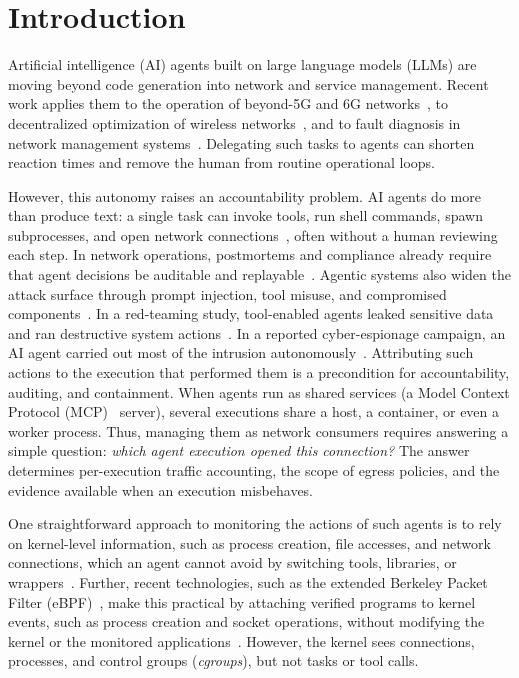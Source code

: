 \section{Introduction}

Artificial intelligence (AI) agents built on large language models (LLMs) are moving beyond code generation into network and service management. Recent work applies them to the operation of beyond-5G and 6G networks~\cite{corici2025agents,xiao2025agentic}, to decentralized optimization of wireless networks~\cite{lee2025decentralized}, and to fault diagnosis in network management systems~\cite{chen2025assistant}. Delegating such tasks to agents can shorten reaction times and remove the human from routine operational loops.

However, this autonomy raises an accountability problem. AI agents do more than produce text: a single task can invoke tools, run shell commands, spawn subprocesses, and open network connections~\cite{yao2023react}, often without a human reviewing each step. In network operations, postmortems and compliance already require that agent decisions be auditable and replayable~\cite{martinezpaez2026vetra}. Agentic systems also widen the attack surface through prompt injection, tool misuse, and compromised components~\cite{chhabra2026agentic,ma2026openclaw}. In a red-teaming study, tool-enabled agents leaked sensitive data and ran destructive system actions~\cite{shapira2026chaos}. In a reported cyber-espionage campaign, an AI agent carried out most of the intrusion autonomously~\cite{anthropic2025espionage,dawson2026agentic}. Attributing such actions to the execution that performed them is a precondition for accountability, auditing, and containment. When agents run as shared services (\eg a Model Context Protocol (MCP)~\cite{mcp2025spec} server), several executions share a host, a container, or even a worker process. Thus, managing them as network consumers requires answering a simple question: \emph{which agent execution opened this connection?} The answer determines per-execution traffic accounting, the scope of egress policies, and the evidence available when an execution misbehaves.

One straightforward approach to monitoring the actions of such agents is to rely on kernel-level information, such as process creation, file accesses, and network connections, which an agent cannot avoid by switching tools, libraries, or wrappers~\cite{tetragon}. Further, recent technologies, such as the extended Berkeley Packet Filter (eBPF)~\cite{ebpf}, make this practical by attaching verified programs to kernel events, such as process creation and socket operations, without modifying the kernel or the monitored applications~\cite{gbadamosi2024ebpf}. However, the kernel sees connections, processes, and control groups (\textit{cgroups}), but not tasks or tool calls. 


